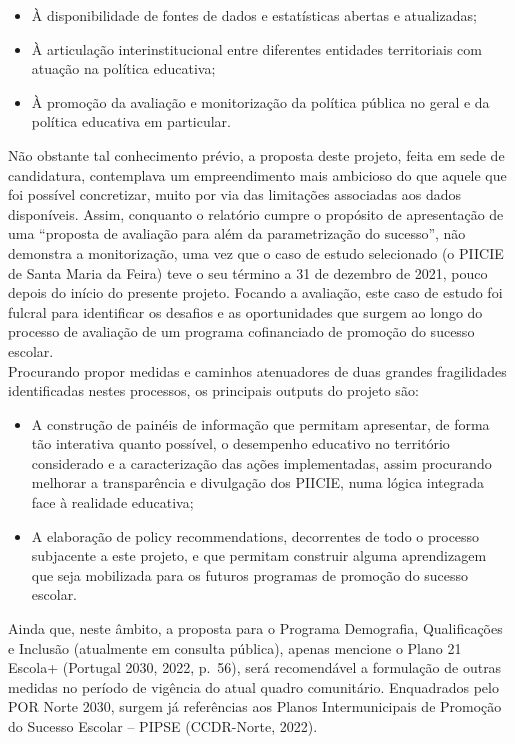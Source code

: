 \documentclass[
]{book}
\providecommand{\tightlist}{%
  \setlength{\itemsep}{0pt}\setlength{\parskip}{0pt}}
\theoremstyle{definition}
\theoremstyle{definition}
\theoremstyle{definition}
\theoremstyle{definition}
\theoremstyle{remark}
\begin{document}
\begin{itemize}
\tightlist
\item
  À disponibilidade de fontes de dados e estatísticas abertas e atualizadas;
\item
  À articulação interinstitucional entre diferentes entidades territoriais com atuação na política educativa;
\item
  À promoção da avaliação e monitorização da política pública no geral e da política educativa em particular.
\end{itemize}

Não obstante tal conhecimento prévio, a proposta deste projeto, feita em sede de candidatura, contemplava um empreendimento mais ambicioso do que aquele que foi possível concretizar, muito por via das limitações associadas aos dados disponíveis. Assim, conquanto o relatório cumpre o propósito de apresentação de uma ``proposta de avaliação para além da parametrização do sucesso'', não demonstra a monitorização, uma vez que o caso de estudo selecionado (o PIICIE de Santa Maria da Feira) teve o seu término a 31 de dezembro de 2021, pouco depois do início do presente projeto. Focando a avaliação, este caso de estudo foi fulcral para identificar os desafios e as oportunidades que surgem ao longo do processo de avaliação de um programa cofinanciado de promoção do sucesso escolar.\\
Procurando propor medidas e caminhos atenuadores de duas grandes fragilidades identificadas nestes processos, os principais outputs do projeto são:

\begin{itemize}
\tightlist
\item
  A construção de painéis de informação que permitam apresentar, de forma tão interativa quanto possível, o desempenho educativo no território considerado e a caracterização das ações implementadas, assim procurando melhorar a transparência e divulgação dos PIICIE, numa lógica integrada face à realidade educativa;
\item
  A elaboração de policy recommendations, decorrentes de todo o processo subjacente a este projeto, e que permitam construir alguma aprendizagem que seja mobilizada para os futuros programas de promoção do sucesso escolar.
\end{itemize}

Ainda que, neste âmbito, a proposta para o Programa Demografia, Qualificações e Inclusão (atualmente em consulta pública), apenas mencione o Plano 21 Escola+ (Portugal 2030, 2022, p.~56), será recomendável a formulação de outras medidas no período de vigência do atual quadro comunitário. Enquadrados pelo POR Norte 2030, surgem já referências aos Planos Intermunicipais de Promoção do Sucesso Escolar -- PIPSE (CCDR-Norte, 2022).
\end{document}
